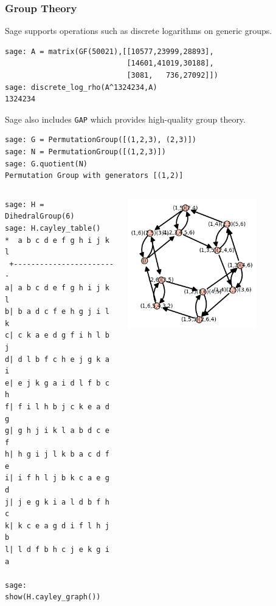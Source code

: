 \documentclass[10pt]{beamer}
\begin{document}
\begin{frame}
\frametitle{Group Theory}

Sage supports operations such as discrete logarithms on generic groups.

\begin{lstlisting}
sage: A = matrix(GF(50021),[[10577,23999,28893],
                            [14601,41019,30188],
                            [3081,   736,27092]])
sage: discrete_log_rho(A^1324234,A)
1324234
\end{lstlisting}

Sage also includes {\tt GAP} which provides high-quality group theory.

\begin{lstlisting}
sage: G = PermutationGroup([(1,2,3), (2,3)])
sage: N = PermutationGroup([(1,2,3)])
sage: G.quotient(N)
Permutation Group with generators [(1,2)]
\end{lstlisting}

\framebreak

\begin{columns}
\begin{lstlisting}
sage: H = DihedralGroup(6)
sage: H.cayley_table()
*  a b c d e f g h i j k l
 +------------------------
a| a b c d e f g h i j k l
b| b a d c f e h g j i l k
c| c k a e d g f i h l b j
d| d l b f c h e j g k a i
e| e j k g a i d l f b c h
f| f i l h b j c k e a d g
g| g h j i k l a b d c e f
h| h g i j l k b a c d f e
i| i f h l j b k c a e g d
j| j e g k i a l d b f h c
k| k c e a g d i f l h j b
l| l d f b h c j e k g i a

sage: show(H.cayley_graph())
\end{lstlisting}
\centering
\includegraphics[width=0.7\textwidth]{caleygraph.png}
\end{columns}
\end{frame}
\end{document}
